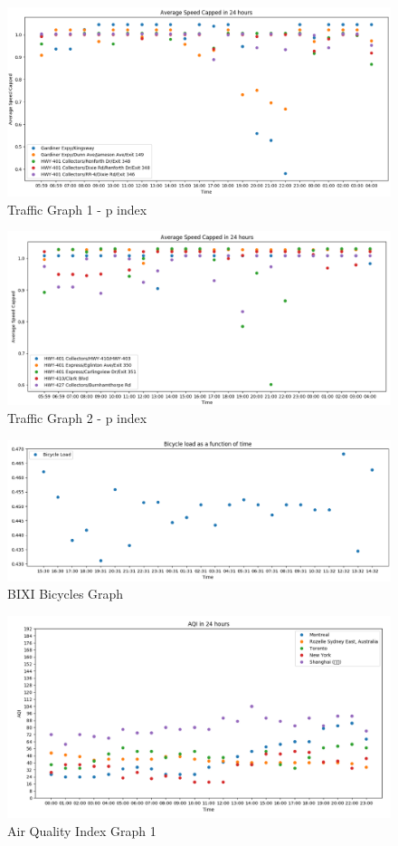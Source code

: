 \documentclass[12pt]{article}
\begin{document}
\begin{figure}[h]
	\centering
	\includegraphics[scale=0.4]{traffic-graph-p-1}
	\caption{Traffic Graph 1 - p index}
\end{figure}

\begin{figure}[h]
	\centering
	\includegraphics[scale=0.4]{traffic-graph-p-2}
	\caption{Traffic Graph 2 - p index}
\end{figure}

\begin{figure}[h]
	\centering
	\includegraphics[scale=0.4]{bixi-graph-1}
	\caption{BIXI Bicycles Graph}
\end{figure}


\begin{figure}[h]
	\centering
	\includegraphics[scale=0.4]{aqi-graph-1}
	\caption{Air Quality Index Graph 1}
\end{figure}
\end{document}
